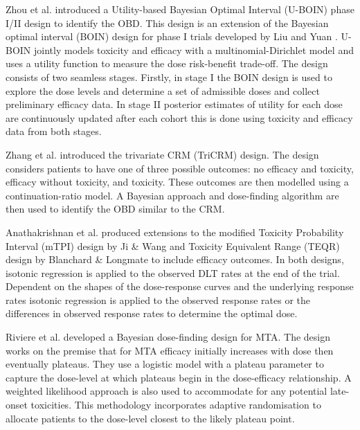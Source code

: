 Zhou et al. \cite{zhouUtilitybasedBayesianOptimal2019} introduced a Utility-based Bayesian Optimal Interval (U-BOIN) phase \RN{1}/\RN{2} design to identify the OBD. This design is an extension of the Bayesian optimal interval (BOIN) design for phase \RN{1} trials developed by Liu and Yuan \cite{liuBAYESIANDATAAUGMENTATION2013}. U-BOIN jointly models toxicity and efficacy with a multinomial-Dirichlet model and uses a utility function to measure the dose risk-benefit trade-off. The design consists of two seamless stages. Firstly, in stage \RN{1} the BOIN design is used to explore the dose levels and determine a set of admissible doses and collect preliminary efficacy data. In stage \RN{2} posterior estimates of utility for each dose are continuously updated after each cohort this is done using toxicity and efficacy data from both stages. 

Zhang et al. \cite{zhangAdaptiveDosefindingDesign2006} introduced the trivariate CRM (TriCRM) design. The design considers patients to have one of three possible outcomes: no efficacy and toxicity, efficacy without toxicity, and toxicity. These outcomes are then modelled using a continuation-ratio model. A Bayesian approach and dose-finding algorithm are then used to identify the OBD similar to the CRM.  

Anathakrishnan et al. \cite{ananthakrishnanExtensionsMTPITEQR2018} produced extensions to the modified Toxicity Probability Interval (mTPI) design by Ji \& Wang \cite{jiModifiedToxicityProbability2013} and Toxicity Equivalent Range (TEQR) design by Blanchard \& Longmate \cite{blanchardToxicityEquivalenceRange2011} to include efficacy outcomes. In both designs, isotonic regression is applied to the observed DLT rates at the end of the trial. Dependent on the shapes of the dose-response curves and the underlying response rates isotonic regression is applied to the observed response rates or the differences in observed response rates to determine the optimal dose. 

Riviere et al. \cite{rivierePhaseIIDosefinding2018} developed a Bayesian dose-finding design for MTA. The design works on the premise that for MTA efficacy initially increases with dose then eventually plateaus. They use a logistic model with a plateau parameter to capture the dose-level at which plateaus begin in the dose-efficacy relationship. A weighted likelihood approach is also used to accommodate for any potential late-onset toxicities. This methodology incorporates adaptive randomisation to allocate patients to the dose-level closest to the likely plateau point.

